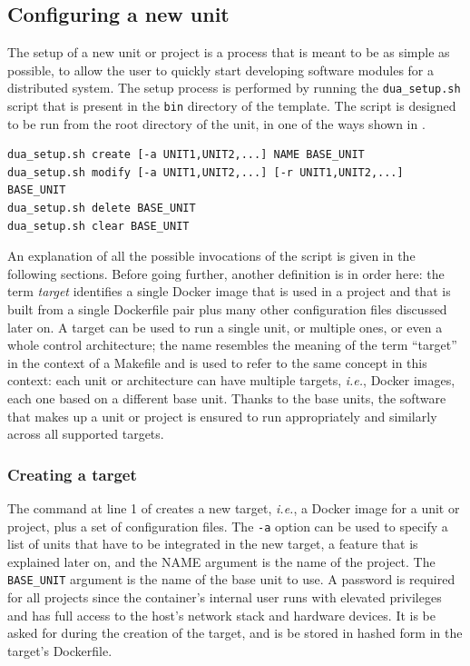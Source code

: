 \subsection{Configuring a new unit}
\label{sec:dua_template_configuration}
The setup of a new unit or project is a process that is meant to be as simple as possible, to allow the user to quickly start developing software modules for a distributed system. The setup process is performed by running the \texttt{dua\_setup.sh} script that is present in the \texttt{bin} directory of the template. The script is designed to be run from the root directory of the unit, in one of the ways shown in .
\begin{center}
\begin{minipage}[t]{.9\textwidth}
\begin{lstlisting}[caption=Possible invocations of the \texttt{dua\_setup.sh} script., label={lst:duasetup}]
dua_setup.sh create [-a UNIT1,UNIT2,...] NAME BASE_UNIT
dua_setup.sh modify [-a UNIT1,UNIT2,...] [-r UNIT1,UNIT2,...] BASE_UNIT
dua_setup.sh delete BASE_UNIT
dua_setup.sh clear BASE_UNIT
\end{lstlisting}
\end{minipage}
\end{center}
An explanation of all the possible invocations of the script is given in the following sections. Before going further, another definition is in order here: the term \emph{target} identifies a single Docker image that is used in a project and that is built from a single Dockerfile pair plus many other configuration files discussed later on. A target can be used to run a single unit, or multiple ones, or even a whole control architecture; the name resembles the meaning of the term ``target'' in the context of a Makefile and is used to refer to the same concept in this context: each unit or architecture can have multiple targets, \emph{i.e.}, Docker images, each one based on a different base unit. Thanks to the base units, the software that makes up a unit or project is ensured to run appropriately and similarly across all supported targets.

\subsubsection{Creating a target}
\label{sec:dua_template_configuration_create}
The command at line 1 of  creates a new target, \emph{i.e.}, a Docker image for a unit or project, plus a set of configuration files. The \texttt{-a} option can be used to specify a list of units that have to be integrated in the new target, a feature that is explained later on, and the NAME argument is the name of the project. The \texttt{BASE\_UNIT} argument is the name of the base unit to use. A password is required for all projects since the container's internal user runs with elevated privileges and has full access to the host's network stack and hardware devices. It is be asked for during the creation of the target, and is be stored in hashed form in the target's Dockerfile.

